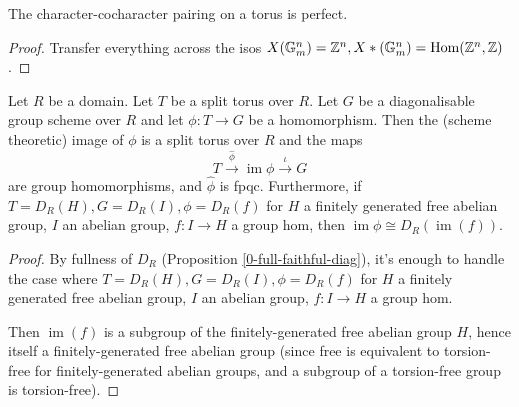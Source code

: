 \begin{proposition}
  \label{0-char-cochar-pairing-perfect}
  \leanok

  The character-cocharacter pairing on a torus is perfect.
\end{proposition}
\begin{proof}
  \uses{}
  \leanok

  Transfer everything across the isos $X({\mathbb G}_m^n) = {\mathbb Z}^n, X*({\mathbb G}_m^n) = \operatorname{Hom}({\mathbb Z}^n, {\mathbb Z})$.
\end{proof}


\begin{proposition}
  \label{1-1-1-group-hom-torus} %

  Let $R$ be a domain. Let $T$ be a split torus over $R$.
  Let $G$ be a diagonalisable group scheme over $R$ and let $\phi: T \to G$ be a homomorphism.
  Then the (scheme theoretic) image of $\phi$ is a split torus over $R$ and the maps
  \[
    T \xrightarrow{\hat{\phi}} \operatorname{im}\phi \xrightarrow{\iota} G
  \]
  are group homomorphisms, and $\hat{\phi}$ is fpqc.
  Furthermore, if $T = D_R(H), G = D_R(I), \phi = D_R(f)$
  for $H$ a finitely generated free abelian group, $I$ an abelian group, $f : I \to H$ a group hom,
  then $\operatorname{im} \phi \cong D_R(\operatorname{im}(f))$.
\end{proposition}
\begin{proof}

  By fullness of $D_R$ (Proposition \ref{0-full-faithful-diag}),
  it's enough to handle the case where $T = D_R(H), G = D_R(I), \phi = D_R(f)$
  for $H$ a finitely generated free abelian group, $I$ an abelian group, $f : I \to H$ a group hom.

  Then $\operatorname{im}(f)$ is a subgroup of the finitely-generated free abelian group $H$,
  hence itself a finitely-generated free abelian group
  (since free is equivalent to torsion-free for finitely-generated abelian groups,
  and a subgroup of a torsion-free group is torsion-free).
\end{proof}


